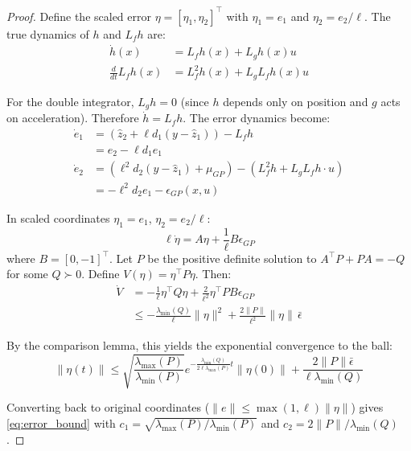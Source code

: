 \documentclass[letterpaper, 10 pt, conference]{ieeeconf}
\begin{document}
\begin{proof}
Define the scaled error $\eta = [\eta_1, \eta_2]^\top$ with $\eta_1 = e_1$ and $\eta_2 = e_2/\ell$. The true dynamics of $h$ and $L_f h$ are:
\begin{align}
    \dot{h}(x) &= L_f h(x) + L_g h(x) u \\
    \frac{d}{dt}L_f h(x) &= L_f^2 h(x) + L_g L_f h(x) u
\end{align}

For the double integrator, $L_g h = 0$ (since $h$ depends only on position and $g$ acts on acceleration). Therefore $\dot{h} = L_f h$. The error dynamics become:
\begin{align}
    \dot{e}_1 &= (\hat{z}_2 + \ell d_1(y - \hat{z}_1)) - L_f h \\
              &= e_2 - \ell d_1 e_1 \\
    \dot{e}_2 &= (\ell^2 d_2(y - \hat{z}_1) + \mu_{GP}) - (L_f^2 h + L_g L_f h \cdot u) \\
              &= -\ell^2 d_2 e_1 - \epsilon_{GP}(x, u)
\end{align}

In scaled coordinates $\eta_1 = e_1$, $\eta_2 = e_2/\ell$:
\begin{equation}
    \ell \dot{\eta} = A \eta + \frac{1}{\ell} B \epsilon_{GP}
\end{equation}
where $B = [0, -1]^\top$. Let $P$ be the positive definite solution to $A^\top P + P A = -Q$ for some $Q \succ 0$. Define $V(\eta) = \eta^\top P \eta$. Then:
\begin{align}
    \dot{V} &= -\frac{1}{\ell} \eta^\top Q \eta + \frac{2}{\ell^2} \eta^\top P B \epsilon_{GP} \\
    &\leq -\frac{\lambda_{\min}(Q)}{\ell} \|\eta\|^2 + \frac{2\|P\|}{\ell^2} \|\eta\| \, \bar{\epsilon}
\end{align}

By the comparison lemma, this yields the exponential convergence to the ball:
\begin{equation}
    \|\eta(t)\| \leq \sqrt{\frac{\lambda_{\max}(P)}{\lambda_{\min}(P)}} e^{-\frac{\lambda_{\min}(Q)}{2\ell \lambda_{\max}(P)} t} \|\eta(0)\| + \frac{2\|P\| \bar{\epsilon}}{\ell \lambda_{\min}(Q)}
\end{equation}

Converting back to original coordinates ($\|e\| \leq \max(1, \ell)\|\eta\|$) gives \eqref{eq:error_bound} with $c_1 = \sqrt{\lambda_{\max}(P)/\lambda_{\min}(P)}$ and $c_2 = 2\|P\|/\lambda_{\min}(Q)$.
\end{proof}
\end{document}
